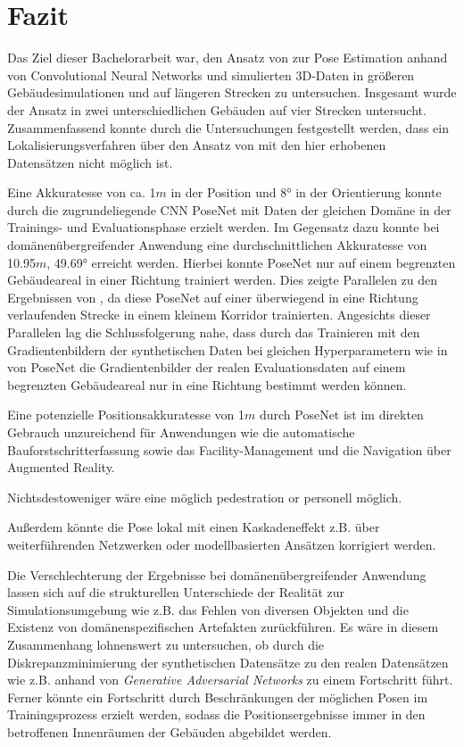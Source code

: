 
\section{Fazit}
\label{sec:kapitel_6}
Das Ziel dieser Bachelorarbeit war, den Ansatz von \citet{acharyaBIMPoseNetIndoorCamera2019} zur Pose Estimation anhand von Convolutional Neural Networks und simulierten 3D-Daten in größeren Gebäudesimulationen und auf längeren Strecken zu untersuchen.
Insgesamt wurde der Ansatz in zwei unterschiedlichen Gebäuden auf vier Strecken untersucht. Zusammenfassend konnte durch die Untersuchungen festgestellt werden, dass ein Lokalisierungsverfahren über den Ansatz von \citet{acharyaBIMPoseNetIndoorCamera2019} mit den hier erhobenen Datensätzen nicht möglich ist.


Eine Akkuratesse von ca. 1$m$ in der Position und 8° in der Orientierung konnte durch die zugrundeliegende CNN PoseNet mit Daten der gleichen Domäne in der Trainings- und Evaluationsphase erzielt werden. Im Gegensatz dazu konnte bei domänenübergreifender Anwendung eine durchschnittlichen Akkuratesse von 10.95$m$, 49.69° erreicht werden. Hierbei konnte PoseNet nur auf einem begrenzten Gebäudeareal in einer Richtung trainiert werden. Dies zeigte Parallelen zu den Ergebnissen von \citet{acharyaBIMPoseNetIndoorCamera2019}, da diese PoseNet auf einer überwiegend in eine Richtung verlaufenden Strecke in einem kleinem Korridor trainierten. Angesichts dieser Parallelen lag die Schlussfolgerung nahe, dass durch das Trainieren mit den Gradientenbildern der synthetischen Daten bei gleichen Hyperparametern wie in \cite{acharyaBIMPoseNetIndoorCamera2019} von PoseNet die Gradientenbilder der realen Evaluationsdaten auf einem begrenzten Gebäudeareal nur in eine Richtung bestimmt werden können.

Eine potenzielle Positionsakkuratesse von 1$m$ durch PoseNet ist im direkten Gebrauch unzureichend für Anwendungen wie die automatische Bauforstschritterfassung sowie das Facility-Manage\-ment und die Navigation über Augmented Reality. 

Nichtsdestoweniger wäre eine möglich pedestration or personell möglich.

Außerdem könnte die Pose lokal mit einen Kaskadeneffekt z.B. über weiterführenden Netzwerken oder modellbasierten Ansätzen korrigiert werden.

Die Verschlechterung der Ergebnisse bei domänenübergreifender Anwendung lassen sich auf die strukturellen Unterschiede der Realität zur Simulationsumgebung wie z.B. das Fehlen von diversen Objekten und die Existenz von domänenspezifischen Artefakten zurückführen. Es wäre in diesem Zusammenhang lohnenswert zu untersuchen, ob durch die Diskrepanzminimierung der synthetischen Datensätze zu den realen Datensätzen wie z.B. anhand von \textit{Generative Adversarial Networks} zu einem Fortschritt führt. Ferner könnte ein Fortschritt durch Beschränkungen der möglichen Posen im Trainingsprozess erzielt werden, sodass die Positionsergebnisse immer in den betroffenen Innenräumen der Gebäuden abgebildet werden.
